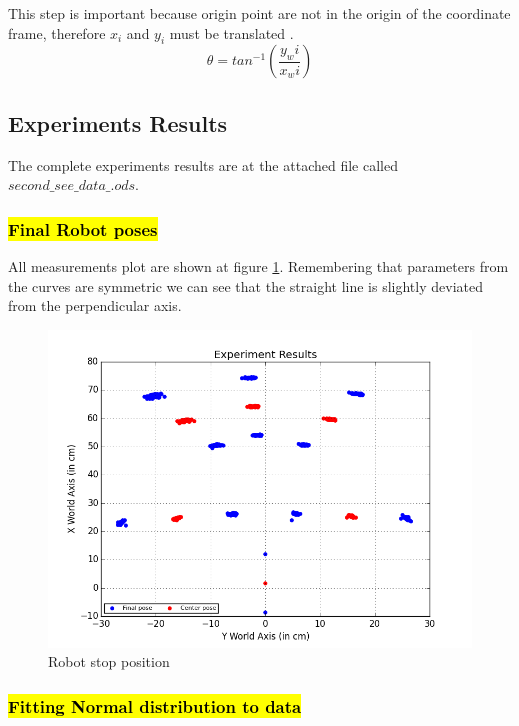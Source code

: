 \documentclass[10pt]{scrartcl}
\begin{document}
\normalsize
This step is important because origin point are not in the origin of the coordinate frame, therefore $x_i$ and $y_i$ must be translated .
	\[
	\theta = tan^{-1}\left(\frac{y_wi}{x_wi}\right)
	\]

\subsection*{Experiments Results}

The complete experiments results are at the attached file called $second\_see \_data\_.ods$.\\
\subsubsection*{\hl{Final Robot poses}}

All measurements plot are shown at figure \ref{fig:10}. Remembering that parameters from the curves are symmetric we can see that the straight line is slightly deviated from the perpendicular axis.\\

\begin{figure}[H]
\centering
\includegraphics[scale=0.70]{images/robot_pose_new}
\caption{Robot stop position}
\label{fig:10}
\end{figure}



\subsubsection*{\hl{Fitting Normal distribution to data}}
\end{document}
